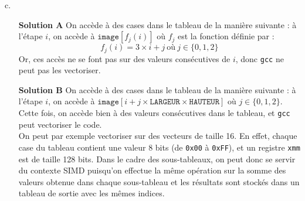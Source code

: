 \documentclass[11pt, a4 paper]{article}
\begin{document}
c. \begin{itemize}
    \item[\textbf{Solution A}] On accède à des cases dans le tableau de la manière suivante : à l'étape $i$, on accède à $\texttt{image}[f_j(i)]$ où $f_j$ est la fonction définie par :\\ 
    \begin{equation*}
    f_j(i) = 3 \times i + j~\text{où}~j \in \{0,1,2\}
    \end{equation*}
    Or, ces accès ne se font pas sur des valeurs consécutives de $i$, donc \texttt{gcc} ne peut pas les vectoriser.\\
    \item[\textbf{Solution B}] On accède à des cases dans le tableau de la manière suivante : à l'étape $i$, on accède à $\texttt{image}[i+j\times\texttt{LARGEUR}\times\texttt{HAUTEUR}]$ où $j \in \{0,1,2\}$. Cette fois, on accède bien à des valeurs consécutives dans le tableau, et \texttt{gcc} peut vectoriser le code.\\
    On peut par exemple vectoriser sur des vecteurs de taille 16.
    En effet, chaque case du tableau contient une valeur 8 bits (de \texttt{0x00} à \texttt{0xFF}), et un registre \texttt{xmm} est de taille 128 bits. Dans le cadre des sous-tableaux, on peut donc se servir du contexte SIMD puisqu'on effectue la même opération sur la somme des valeurs obtenue dans chaque sous-tableau et les résultats sont stockés dans un tableau de sortie avec les mêmes indices.\\


\end{itemize}
\end{document}
